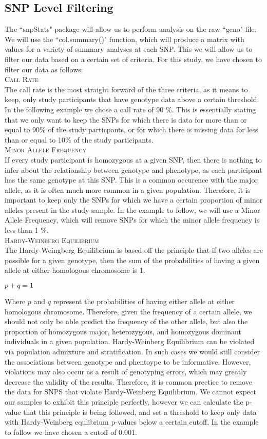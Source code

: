 \documentclass{ar2e}
\begin{document}
\subsection{SNP Level Filtering}
The ``snpStats" package will allow us to perform analysis on the raw ``geno" file.  We will use the ``col.summary()" function, which will produce a matrix with values for a variety of summary analyses at each SNP.
This we will allow us to filter our data based on a certain set of criteria.  For this study, we have chosen to filter our data as follows: \\
\textsc{Call Rate}\\
The call rate is the most straight forward of the three criteria, as it means to keep, only study participants that have genotype data above a certain threshold. In the following example we chose a call rate of 90 \%.  This is essentially stating that we only want to keep the SNPs for which there is data for more than or equal to 90\% of the study particpants, or for which there is missing data for less than or equal to 10\% of the study participants.\\
\textsc{Minor Allele Frequency}\\
If every study participant is homozygous at a given SNP, then there is nothing to infer about the relationship between genotype and phenotype, as each participant has the same genotype at this SNP.  This is a common occurence with the major allele, as it is often much more common in a given population.  Therefore, it is important to keep only the SNPs for which we have a certain proportion of minor alleles present in the study sample.  In the example to follow, we will use a Minor Allele Frequency, which will remove SNPs for which the minor allele frequency is less than 1 \%.\\
\textsc{Hardy-Weinberg Equilibrium}\\
The Hardy-Weingberg Equilibrium is based off the principle that if two alleles are possible for a given genotype, then the sum of the probabilities of having a given allele at either homologous chromosome is 1.

\centerline{$p+q=1$}

Where $p$ and $q$ represent the probabilities of having either allele at either homologous chromosome.
Therefore, given the frequency of a certain allele, we should not only be able predict the frequency of the other allele, but also the proportion of homozygous major, heterozygous, and homozygous dominant individuals in a given population. Hardy-Weinberg Equilibrium can be violated via population admixture and stratification. In such cases we would still consider the associations between genotype and phentoype to be informative. However, violations may also occur as a result of genotyping errors, which may greatly decrease the validity of the results.  Therefore, it is common prectice to remove the data for SNPS that violate Hardy-Weinberg Equilibrium. We cannot expect our samples to exhibit this principle perfectly, however we can calculate the p-value that this principle is being followed, and set a threshold to keep only data with Hardy-Weinberg equlibrium p-values below a certain cutoff. In the example to follow we have chosen a cutoff of 0.001.
\end{document}

